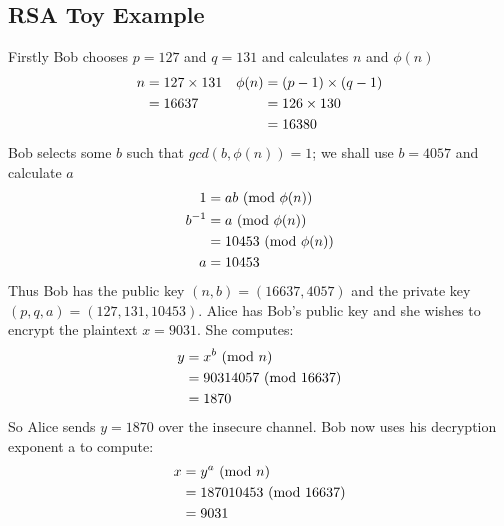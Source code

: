 \subsection{RSA Toy Example}
Firstly Bob chooses $p = 127$ and $q = 131$ and calculates $n$ and $\phi(n)$
\begin{align*}
    n &= 127  \times 131  &\phi(n) &= (p - 1) \times (q - 1)\\
      &= 16637            &        &= 126        \times 130       \\
      &                   &        &= 16380
\end{align*}
Bob selects some $b$ such that $gcd(b, \phi(n)) = 1$;
we shall use $b = 4057$ and calculate $a$
\begin{align*}
    1      &= ab \ (\mathrm{mod}\ \phi(n))\\
    b^{-1} &= a \ (\mathrm{mod}\ \phi(n))\\
           &= 10453 \ (\mathrm{mod}\ \phi(n))\\
         a &= 10453
\end{align*}
Thus Bob has the public key $(n,b) = (16637,4057)$ and the private key $(p,q,a) = (127, 131, 10453)$.
Alice has Bob’s public key and she wishes to encrypt the plaintext $x = 9031$.
She computes:
\begin{align*}
   y &= x^b \ (\mathrm{mod}\ n) \\
     &= 90314057 \ (\mathrm{mod}\ 16637) \\
     &= 1870
\end{align*}
So Alice sends $y = 1870$ over the insecure channel. Bob now uses his decryption exponent a to compute:
\begin{align*}
   x &= y^a \ (\mathrm{mod}\ n) \\
     &= 187010453 \ (\mathrm{mod}\ 16637) \\
     &= 9031
\end{align*}

